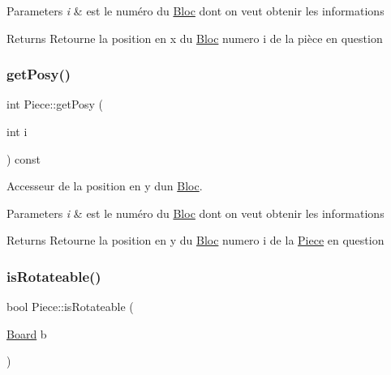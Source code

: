 \begin{DoxyParams}{Parameters}
{\em i} & est le numéro du \hyperlink{classBloc}{Bloc} dont on veut obtenir les informations \\
\hline
\end{DoxyParams}
\begin{DoxyReturn}{Returns}
Retourne la position en x du \hyperlink{classBloc}{Bloc} numero i de la pièce en question 
\end{DoxyReturn}
\mbox{\label{classPiece_a24ca14604d394b821bf89d690c6de477}} 
\subsubsection{\texorpdfstring{get\+Posy()}{getPosy()}}
{\footnotesize\ttfamily int Piece\+::get\+Posy (\begin{DoxyParamCaption}\item[{int}]{i }\end{DoxyParamCaption}) const}



Accesseur de la position en y d\textquotesingle{}un \hyperlink{classBloc}{Bloc}. 


\begin{DoxyParams}{Parameters}
{\em i} & est le numéro du \hyperlink{classBloc}{Bloc} dont on veut obtenir les informations \\
\hline
\end{DoxyParams}
\begin{DoxyReturn}{Returns}
Retourne la position en y du \hyperlink{classBloc}{Bloc} numero i de la \hyperlink{classPiece}{Piece} en question 
\end{DoxyReturn}
\mbox{\label{classPiece_a56cdf7f4234fe848a3e203b693b7a862}} 
\subsubsection{\texorpdfstring{is\+Rotateable()}{isRotateable()}}
{\footnotesize\ttfamily bool Piece\+::is\+Rotateable (\begin{DoxyParamCaption}\item[{\hyperlink{classBoard}{Board}}]{b }\end{DoxyParamCaption})\hspace{0.3cm}{\ttfamily [pure virtual]}}



